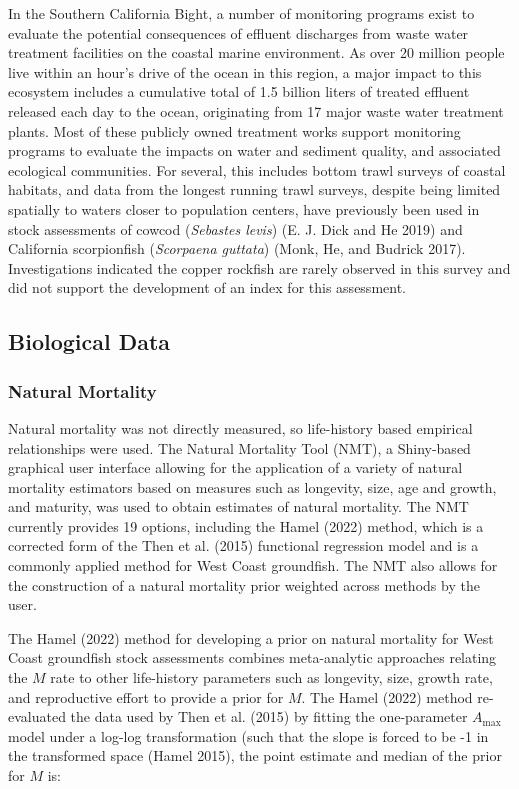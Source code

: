 \documentclass[11pt,
  english,
  letterpaper,
]{article}
\begin{document}
In the Southern California Bight, a number of monitoring programs exist to evaluate the potential consequences of effluent discharges from waste water treatment facilities on the coastal marine environment. As over 20 million people live within an hour's drive of the ocean in this region, a major impact to this ecosystem includes a cumulative total of 1.5 billion liters of treated effluent released each day to the ocean, originating from 17 major waste water treatment plants. Most of these publicly owned treatment works support monitoring programs to evaluate the impacts on water and sediment quality, and associated ecological communities. For several, this includes bottom trawl surveys of coastal habitats, and data from the longest running trawl surveys, despite being limited spatially to waters closer to population centers, have previously been used in stock assessments of cowcod (\emph{Sebastes levis}) (E. J. Dick and He 2019) and California scorpionfish (\emph{Scorpaena guttata}) (Monk, He, and Budrick 2017). Investigations indicated the copper rockfish are rarely observed in this survey and did not support the development of an index for this assessment.

\hypertarget{biological-data}{%
\subsection{Biological Data}\label{biological-data}}

\hypertarget{natural-mortality}{%
\subsubsection{Natural Mortality}\label{natural-mortality}}

Natural mortality was not directly measured, so life-history based empirical relationships were used. The Natural Mortality Tool (NMT), a Shiny-based graphical user interface allowing for the application of a variety of natural mortality estimators based on measures such as longevity, size, age and growth, and maturity, was used to obtain estimates of natural mortality. The NMT currently provides 19 options, including the Hamel (2022) method, which is a corrected form of the Then et al. (2015) functional regression model and is a commonly applied method for West Coast groundfish. The NMT also allows for the construction of a natural mortality prior weighted across methods by the user.

The Hamel (2022) method for developing a prior on natural mortality for West Coast groundfish stock assessments combines meta-analytic approaches relating the \(M\) rate to other life-history parameters such as longevity, size, growth rate, and reproductive effort to provide a prior for \(M\). The Hamel (2022) method re-evaluated the data used by Then et al. (2015) by fitting the one-parameter \(A_{\text{max}}\) model under a log-log transformation (such that the slope is forced to be -1 in the transformed space (Hamel 2015), the point estimate and median of the prior for \(M\) is:
\end{document}
